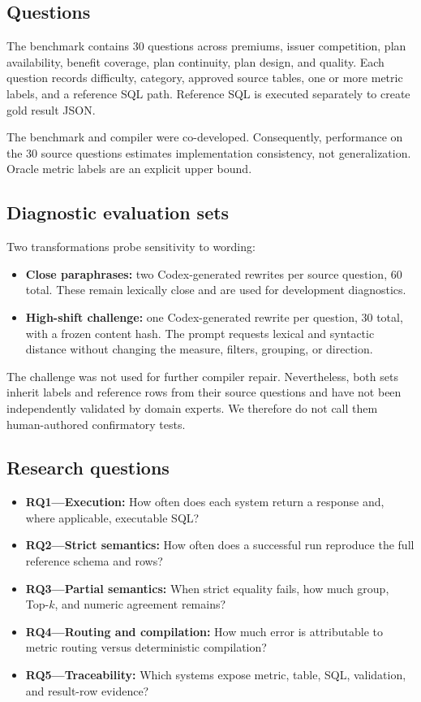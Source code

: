 \documentclass[11pt]{article}
\begin{document}
\subsection{Questions}

The benchmark contains 30 questions across premiums, issuer competition, plan
availability, benefit coverage, plan continuity, plan design, and quality. Each
question records difficulty, category, approved source tables, one or more metric
labels, and a reference SQL path. Reference SQL is executed separately to create
gold result JSON.

The benchmark and compiler were co-developed. Consequently, performance on the 30
source questions estimates implementation consistency, not generalization. Oracle
metric labels are an explicit upper bound.

\subsection{Diagnostic evaluation sets}

Two transformations probe sensitivity to wording:
\begin{itemize}[itemsep=2pt,topsep=2pt]
  \item \textbf{Close paraphrases:} two Codex-generated rewrites per source
    question, 60 total. These remain lexically close and are used for
    development diagnostics.
  \item \textbf{High-shift challenge:} one Codex-generated rewrite per question,
    30 total, with a frozen content hash. The prompt requests lexical and
    syntactic distance without changing the measure, filters, grouping, or
    direction.
\end{itemize}

The challenge was not used for further compiler repair. Nevertheless, both sets
inherit labels and reference rows from their source questions and have not been
independently validated by domain experts. We therefore do not call them
human-authored confirmatory tests.

\subsection{Research questions}
\begin{itemize}[itemsep=2pt,topsep=2pt]
  \item \textbf{RQ1---Execution:} How often does each system return a response
    and, where applicable, executable SQL?
  \item \textbf{RQ2---Strict semantics:} How often does a successful run
    reproduce the full reference schema and rows?
  \item \textbf{RQ3---Partial semantics:} When strict equality fails, how much
    group, Top-$k$, and numeric agreement remains?
  \item \textbf{RQ4---Routing and compilation:} How much error is attributable
    to metric routing versus deterministic compilation?
  \item \textbf{RQ5---Traceability:} Which systems expose metric, table, SQL,
    validation, and result-row evidence?
\end{itemize}
\end{document}
